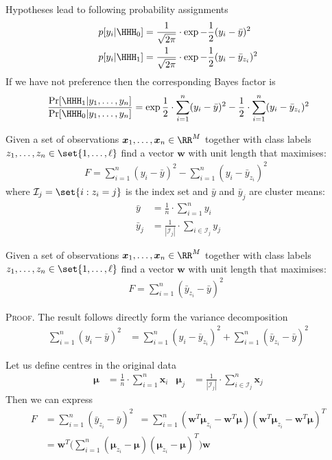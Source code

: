 \documentclass[landscape,footrule]{foils}
\renewcommand{\vec}[1]{\boldsymbol{#1}}
\begin{document}
Hypotheses lead to following probability assignments
\begin{align*}
p[y_i|\HHH_0]&=\frac{1}{\sqrt{2\pi}}\cdot \exp{-\frac{1}{2}(y_i-\bar{y})^2}\\
p[y_i|\HHH_1]&=\frac{1}{\sqrt{2\pi}}\cdot \exp{-\frac{1}{2}(y_i-\bar{y}_{z_i})^2}
\end{align*}
If we have not preference then the corresponding Bayes factor is
\begin{align*}
\frac{\Pr[\HHH_1|y_1,\ldots,y_n]}{\Pr[\HHH_0|y_1,\ldots,y_n]}= 
\exp{\frac{1}{2}\cdot\sum_{i=1}^n(y_i-\bar{y})^2-\frac{1}{2}\cdot\sum_{i=1}^n(y_i-\bar{y}_{z_i})^2}
\end{align*}


Given a set of observations $\vec{x}_1,\ldots,\vec{x}_n\in\RR^M$ together with class labels $z_1,\ldots,z_n\in\set{1,\ldots,\ell}$ find a vector $\vec{w}$ with unit length that maximises:
\begin{align*}
F=\sum_{i=1}^n(y_i-\bar{y})^2-\sum_{i=1}^n(y_i-\bar{y}_{z_i})^2\enspace
\end{align*}
where $\mathcal{I}_j=\set{i: z_i=j}$ is the index set and $\bar{y}$ and $\bar{y}_{j}$ are cluster means: 
\begin{align*}
\bar{y}&=\frac{1}{n}\cdot\sum_{i=1}^n y_i \\
\bar{y}_j&=\frac{1}{|\mathcal{I}_j|}\cdot\sum_{i\in\mathcal{I}_j} y_j 
\end{align*}


Given a set of observations $\vec{x}_1,\ldots,\vec{x}_n\in\RR^M$ together with class labels $z_1,\ldots,z_n\in\set{1,\ldots,\ell}$ find a vector $\vec{w}$ with unit length that maximises:
\begin{align*}
F=\sum_{i=1}^n(\bar{y}_{z_i}-\bar{y})^2\enspace
\end{align*}

\textsc{Proof.}
The result follows directly form the variance decomposition
\begin{align*}
\sum_{i=1}^n (y_i-\bar{y})^2
&=\sum_{i=1}^n (y_i-\bar{y}_{z_i})^2 +\sum_{i=1}^n (\bar{y}_{z_i}-\bar{y})^2
\end{align*}




Let us define centres in the original data 
\begin{align*}
\vec{\mu}&=\frac{1}{n}\cdot\sum_{i=1}^n \vec{x}_i &
\vec{\mu}_j&=\frac{1}{|\mathcal{I}_j|}\cdot\sum_{i\in\mathcal{I}_j}^n \vec{x}_j
\end{align*}
Then we can express
\begin{align*}
F&=\sum_{i=1}^n(\bar{y}_{z_i}-\bar{y})^2\enspace
=\sum_{i=1}^n(\vec{w}^T\vec{\mu}_{z_i}-\vec{w}^T\vec{\mu})(\vec{w}^T\vec{\mu}_{z_i}-\vec{w}^T\vec{\mu})^T\\
&=\vec{w}^T\Biggl(\sum_{i=1}^n(\vec{\mu}_{z_i}-\vec{\mu})(\vec{\mu}_{z_i}-\vec{\mu})^T\Biggr)\vec{w}
\end{align*}
\end{document}
